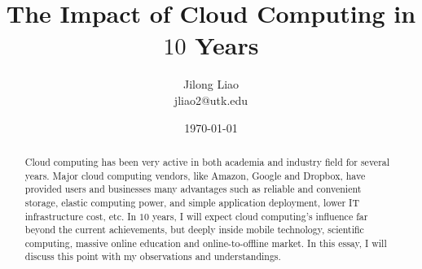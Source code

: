 \documentclass[11pt, times]{article}
\begin{document}
\title{The Impact of Cloud Computing in $10$ Years}
\author{Jilong Liao\\jliao2@utk.edu}
\date{\today}
\maketitle

\begin{abstract}
Cloud computing has been very active in both academia and industry field for several years. Major cloud computing vendors, like Amazon, Google and Dropbox, have provided users and businesses many advantages such as reliable and convenient storage, elastic computing power, and simple application deployment, lower IT infrastructure cost, etc. In $10$ years, I will expect cloud computing's influence far beyond the current achievements, but deeply inside mobile technology, scientific computing, massive online education and online-to-offline market. In this essay, I will discuss this point with my observations and understandings.
\end{abstract}





\end{document}
